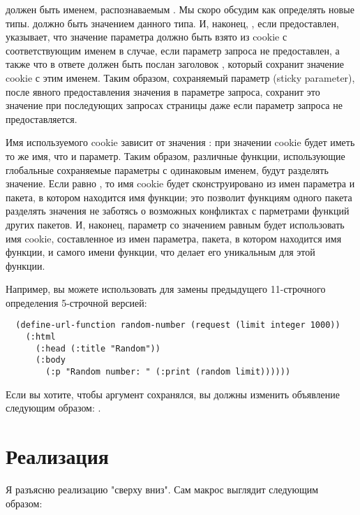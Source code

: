  должен быть именем, распознаваемым . Мы скоро
обсудим как определять новые типы.  должно быть значением данного
типа. И, наконец, , если предоставлен, указывает, что значение параметра
должно быть взято из cookie с соответствующим именем в случае, если параметр запроса не
предоставлен, а также что в ответе должен быть послан заголовок , который
сохранит значение cookie с этим именем. Таким образом, сохраняемый параметр (sticky
parameter), после явного предоставления значения в параметре запроса, сохранит это
значение при последующих запросах страницы даже если параметр запроса не предоставляется.

Имя используемого cookie зависит от значения : при значении 
cookie будет иметь то же имя, что и параметр. Таким образом, различные функции,
использующие глобальные сохраняемые параметры с одинаковым именем, будут разделять
значение. Если  равно , то имя cookie будет сконструировано
из имен параметра и пакета, в котором находится имя функции; это позволит функциям одного
пакета разделять значения не заботясь о возможных конфликтах с парметрами функций других
пакетов. И, наконец, параметр со значением  равным  будет
использовать имя cookie, составленное из имен параметра, пакета, в котором находится имя
функции, и самого имени функции, что делает его уникальным для этой функции.

Например, вы можете использовать  для замены предыдущего
11-строчного определения  5-строчной версией:

\begin{lstlisting}
  (define-url-function random-number (request (limit integer 1000))
    (:html
      (:head (:title "Random"))
      (:body
        (:p "Random number: " (:print (random limit))))))
\end{lstlisting}

Если вы хотите, чтобы аргумент  сохранялся, вы должны изменить объявление
 следующим образом: .

\section{Реализация}

Я разъясню реализацию  "сверху вниз". Сам макрос выглядит
следующим образом:

